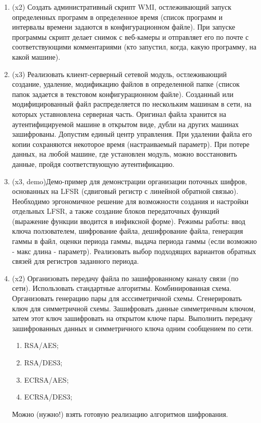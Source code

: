 \documentclass[a4paper]{article}
\begin{document}
\begin{enumerate}
\item (x2) Создать административный скрипт WMI, остлеживающий запуск определенных программ в определенное время (список программ и интервалы времени задаются в конфигурационном файле). При запуске программы скрипт делает снимок с веб-камеры и отправляет его по почте с соответствующими комментариями (кто запустил, когда, какую программу, на какой машине). 

\item (x3) Реализовать клиент-серверный сетевой модуль, остлеживающий создание, удаление, модификацию файлов в определенной папке (список папок задается в текстовом конфигурационном файле). Созданный или модифицированный файл распределяется по нескольким машинам в сети, на которых уставновлена серверная часть. Оригинал файла хранится на аутентифицируемой машине в открытом виде, дубли на других машинах зашифрованы. Допустим единый центр управления. При удалении файла его копии сохраняются некоторое время (настраиваемый параметр). При потере данных, на любой машине, где установлен модуль, можно восстановить данные, пройдя соответствующую аутентификацию.

\item (x3, demo)Демо-пример для демонстрации организации поточных шифров, основанных на LFSR (сдвиговый регистр с линейной обратной связью). Необходимо эргономичное решение для возможности создания и настройки отдельных LFSR, а также создание блоков передаточных функций (выражение функции вводится в инфиксной форме). Режимы работы: ввод ключа ползователем, шифрование файла, дешифрование файла, генерация гаммы в файл, оценки периода гаммы, выдача периода гаммы (если возможно - макс длина - параметр). Реализовать выбор подходящих вариантов обратных связей для регистров заданного периода.

\item (x2) Организовать передачу файла по зашифрованному каналу связи (по сети). Использовать стандартные алгоритмы. Комбинированная схема. Организовать генерацию пары для асссиметричной схемы. Сгенерировать ключ для симметричной схемы. Зашифровать данные симметричным ключом, затем этот ключ зашифровать на открытом ключе пары. Выполнить передачу зашифрованных данных и симметричного ключа одним сообщением по сети. 
\begin{enumerate}
    \item RSA/AES;
    \item RSA/DES3;
    \item ECRSA/AES;
    \item ECRSA/DES3;
\end{enumerate}
Можно (нужно!) взять готовую реализацию алгоритмов шифрования.


\end{enumerate}
\end{document}
